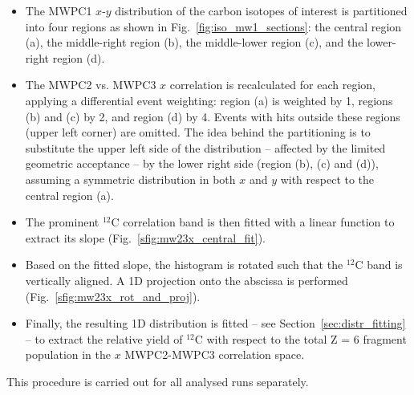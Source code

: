 \begin{itemize}
\item The MWPC1 $x$-$y$ distribution of the carbon isotopes of interest is partitioned into four regions as shown in Fig.~\ref{fig:iso_mw1_sections}: the central region (a), the middle-right region (b), the middle-lower region (c), and the lower-right region (d).
\item The MWPC2 vs. MWPC3 $x$ correlation is recalculated for each region, applying a differential event weighting: region (a) is weighted by 1, regions (b) and (c) by 2, and region (d) by 4. Events with hits outside these regions (upper left corner) are omitted. The idea behind the partitioning is to  substitute the upper left side of the distribution -- affected by the limited geometric acceptance -- by the lower right side  (region (b), (c) and (d)), assuming a symmetric distribution in both $x$ and $y$ with respect to the central region (a). 
\item The prominent $^{12}$C correlation band is then fitted with a linear function to extract its slope (Fig.~\ref{sfig:mw23x_central_fit}).
\item Based on the fitted slope, the histogram is rotated such that the $^{12}$C band is vertically aligned. A 1D projection onto the abscissa is performed (Fig.~\ref{sfig:mw23x_rot_and_proj}).
\item Finally, the resulting 1D distribution is fitted -- see Section~\ref{sec:distr_fitting} -- to extract the relative yield of $^{12}$C with respect to the total Z = 6 fragment population in the $x$ MWPC2-MWPC3 correlation space.
\end{itemize}
This procedure is carried out for all analysed runs separately.


